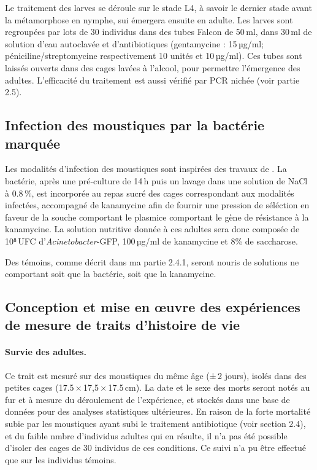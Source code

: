 Le traitement des larves se déroule sur le stade L4, à savoir le dernier stade avant la métamorphose en nymphe, sui émergera ensuite en adulte.
Les larves sont regroupées par lots de 30 individus dans des tubes Falcon de 50\,ml, dans 30\,ml de solution d'eau autoclavée et d'antibiotiques (gentamycine : 15\,µg/ml; péniciline/streptomycine respectivement 10 unités et 10\,µg/ml).
Ces tubes sont laissés ouverts dans des cages lavées à l'alcool, pour permettre l'émergence des adultes.
L'efficacité du traitement est aussi vérifié par PCR nichée (voir partie 2.5).


\subsection{Infection des moustiques par la bactérie marquée}

Les modalités d'infection des moustiques sont inspirées des travaux de \textcite{bahia2014}.
La bactérie, après une pré-culture de 14\,h puis un lavage dans une solution de NaCl à 0.8\,\%, est incorporée au repas sucré des cages correspondant aux modalités infectées, accompagné de kanamycine afin de fournir une pression de séléction en faveur de la souche comportant le plasmice comportant le gène de résistance à la kanamycine.
La solution nutritive donnée à ces adultes sera donc composée de 10⁸\,UFC d'\textit{Acinetobacter}-GFP, 100\,µg/ml de kanamycine et 8\;\% de saccharose.

Des témoins, comme décrit dans ma partie 2.4.1, seront nouris de solutions ne comportant soit que la bactérie, soit que la kanamycine.

\subsection{Conception et mise en \oe{}uvre des expériences de mesure de traits d'histoire de vie}


\paragraph{Survie des adultes.} Ce trait est mesuré sur des moustiques du même âge (±\,2 jours), isolés dans des petites cages (17.5\,×\,17,5\,×\,17.5\,cm). La date et le sexe des morts seront notés au fur et à mesure du déroulement de l'expérience, et stockés dans une base de données pour des analyses statistiques ultérieures.
En raison de la forte mortalité subie par les moustiques ayant subi le traitement antibiotique (voir section 2.4), et du faible nmbre d'individus adultes qui en résulte, il n'a pas été possible d'isoler des cages de 30 individus de ces conditions.
Ce suivi n'a pu être effectué que sur les individus témoins.

